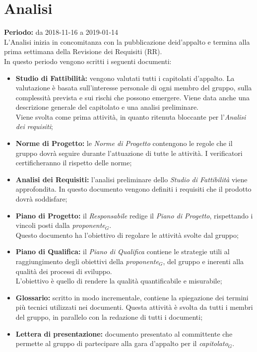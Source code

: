 \section{Analisi}
\textbf{Periodo:} da 2018-11-16 a 2019-01-14\\L'Analisi inizia in concomitanza con la pubblicazione deid’appalto e termina alla prima settimana della  Revisione dei Requisiti (RR).\\
In questo periodo vengono scritti i seguenti documenti:
\begin{itemize}
    \item \textbf{Studio di Fattibilità:} vengono valutati tutti i capitolati d'appalto. La valutazione è basata sull'interesse personale di ogni membro del gruppo, sulla complessità prevista e sui rischi che possono emergere. Viene data anche una descrizione generale del capitolato e una analisi preliminare.\\Viene svolta come prima attività, in quanto ritenuta bloccante per l'\textit{Analisi dei requisiti};
    \item \textbf{Norme di Progetto:} le \textit{Norme di Progetto} contengono le regole che il gruppo dovrà seguire durante l'attuazione di tutte le attività. I verificatori certificheranno il rispetto delle norme;
    \item \textbf{Analisi dei Requisiti:} l'analisi preliminare dello \textit{Studio di Fattibilità} viene approfondita.
    In questo documento vengono definiti i requisiti che il prodotto dovrà soddisfare;
    \item \textbf{Piano di Progetto:} il \textit{Responsabile} redige il \textit{Piano di Progetto}, rispettando i vincoli posti dalla \textit{proponente$_{G}$}.\\Questo documento ha l'obiettivo di regolare le attività svolte dal gruppo;
    \item \textbf{Piano di Qualifica:} il \textit{Piano di Qualifica} contiene le strategie utili al raggiungimento degli obiettivi della \textit{proponente$_{G}$}, del gruppo e inerenti alla qualità dei processi di sviluppo.\\L'obiettivo è quello di rendere la qualità quantificabile e misurabile;
    \item \textbf{Glossario:} scritto in modo incrementale, contiene la spiegazione dei termini più tecnici utilizzati nei documenti. Questa attività è svolta da tutti i membri del gruppo, in parallelo con la redazione di tutti i documenti;
    \item \textbf{Lettera di presentazione:} documento presentato al committente che permette al gruppo di partecipare alla gara d’appalto per il \textit{capitolato$_{G}$}.
\end{itemize}
